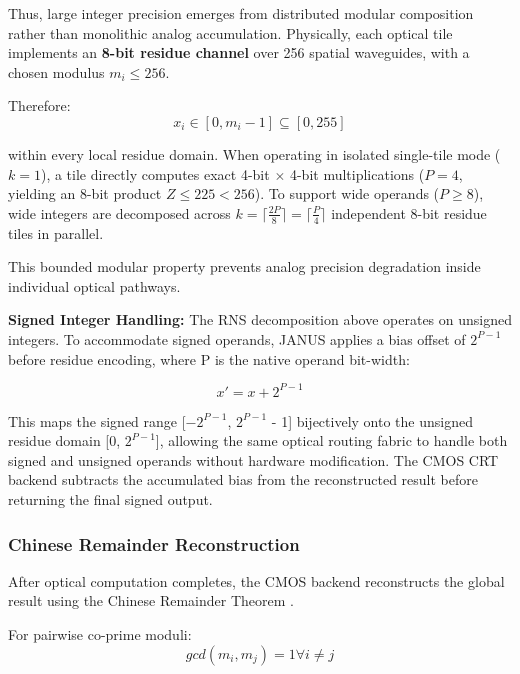 \documentclass[journal]{IEEEtran}
\begin{document}
Thus, large integer precision emerges from distributed modular composition rather than monolithic analog accumulation. Physically, each optical tile implements an \textbf{8-bit residue channel} over 256 spatial waveguides, with a chosen modulus $m_i \le 256$.

Therefore:
\begin{equation}
x_i \in [0, m_i - 1] \subseteq [0, 255]
\end{equation}

within every local residue domain. When operating in isolated single-tile mode ($k=1$), a tile directly computes exact 4-bit $\times$ 4-bit multiplications ($P=4$, yielding an 8-bit product $Z \le 225 < 256$). To support wide operands ($P \ge 8$), wide integers are decomposed across $k = \lceil \frac{2P}{8} \rceil = \lceil \frac{P}{4} \rceil$ independent 8-bit residue tiles in parallel.

This bounded modular property prevents analog precision degradation inside individual optical pathways.

\textbf{Signed Integer Handling:} The RNS decomposition above operates on unsigned integers. To accommodate signed
operands, JANUS applies a bias offset of $2^{P -1}$ before residue encoding, where P is the native operand bit-width:

\begin{equation}
x' = x + 2^{P -1}
\end{equation}

This maps the signed range [$-2^{P -1}$, $2^{P -1}$ - 1] bijectively onto the unsigned residue domain [0, $2^{P - 1}$], allowing the same optical routing fabric to handle both signed and unsigned operands without hardware modification. The CMOS CRT backend subtracts the accumulated bias from the reconstructed result before returning the final signed output.

\subsubsection{\textbf{Chinese Remainder Reconstruction}}

After optical computation completes, the CMOS backend reconstructs the global result using the Chinese Remainder Theorem \cite{Mohan2016}\cite{Wang2000}\cite{Xia2000}.

For pairwise co-prime moduli:
\begin{equation}
gcd(m_i, m_j) = 1 \forall i \neq  j
\end{equation}
\end{document}
